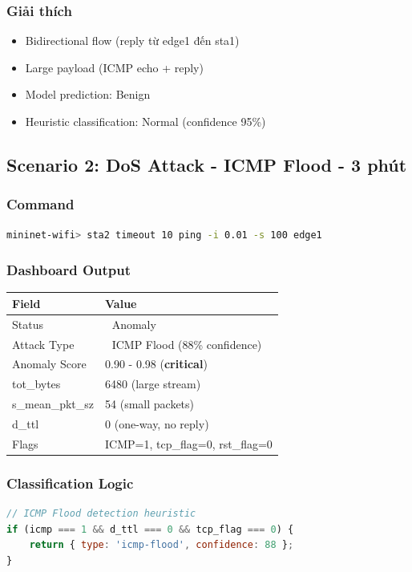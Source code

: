 \documentclass[12pt,a4paper]{article}
\begin{document}
\subsubsection{Giải thích}
\begin{itemize}
    \item Bidirectional flow (reply từ edge1 đến sta1)
    \item Large payload (ICMP echo + reply)
    \item Model prediction: Benign
    \item Heuristic classification: Normal (confidence 95\%)
\end{itemize}

\subsection{Scenario 2: DoS Attack - ICMP Flood - 3 phút}

\subsubsection{Command}
\begin{lstlisting}[language=bash]
mininet-wifi> sta2 timeout 10 ping -i 0.01 -s 100 edge1
\end{lstlisting}

\subsubsection{Dashboard Output}
\begin{table}[h]
\centering
\begin{tabularx}{\textwidth}{|l|X|}
\hline
\textbf{Field} & \textbf{Value} \\
\hline
Status & 🔴 \color{red}Anomaly \\
\hline
Attack Type & 🌊 \color{red}ICMP Flood (88\% confidence) \\
\hline
Anomaly Score & 0.90 - 0.98 (\textbf{critical}) \\
\hline
tot\_bytes & 6480 (large stream) \\
\hline
s\_mean\_pkt\_sz & 54 (small packets) \\
\hline
d\_ttl & 0 (one-way, no reply) \\
\hline
Flags & ICMP=1, tcp\_flag=0, rst\_flag=0 \\
\hline
\end{tabularx}
\end{table}

\subsubsection{Classification Logic}
\begin{lstlisting}[language=javascript]
// ICMP Flood detection heuristic
if (icmp === 1 && d_ttl === 0 && tcp_flag === 0) {
    return { type: 'icmp-flood', confidence: 88 };
}
\end{lstlisting}
\end{document}
